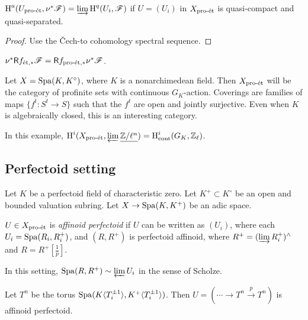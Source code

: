 \begin{lemma}
$\operatorname{H}^a(U_{\textnormal{pro-\'et}},\nu^\ast \mathscr{F}) = \varinjlim \operatorname{H}^q(U_i,\mathscr{F})$ if 
$U=(U_i)$ in $X_{\textnormal{pro-\'et}}$ is quasi-compact and quasi-separated. 
\end{lemma}
\begin{proof}
Use the \v Cech-to cohomology spectral sequence. 
\end{proof}

\begin{lemma}
$\nu^\ast \mathsf R f_{\textnormal{\'et},\ast} \mathscr{F} = \mathsf R f_{\textnormal{pro-\'et},\ast} \nu^\ast \mathscr{F}$. 
\end{lemma}

\begin{example}
Let $X=\operatorname{Spa}(K,K^\circ)$, where $K$ is a nonarchimedean field. Then 
$X_{\textnormal{pro-\'et}}$ will be the category of profinite sets with continuous $G_K$-action. 
Coverings are families of maps $\{f^t:S^t \to S\}$ such that the $f^t$ are open 
and jointly surjective. Even when $K$ is algebraically closed, this is an 
interesting category. 
\end{example}

In this example, $\operatorname{H}^i(X_{\textnormal{pro-\'et}},\varprojlim \underline{\mathbb{Z}/\ell^n}) = \operatorname{H}^i_\text{cont}(G_K,\mathbb{Z}_\ell)$. 






\subsection{Perfectoid setting}

Let $K$ be a perfectoid field of characteristic zero. Let 
$K^+\subset K^\circ$ be an open and bounded valuation subring. Let 
$X\to \operatorname{Spa}(K,K^+)$ be an adic space. 

\begin{definition}\label{def:aff-perf}
$U\in X_{\textnormal{pro-\'et}}$ is \emph{affinoid perfectoid} if $U$ can be written as 
$(U_i)$, where each $U_i=\operatorname{Spa}(R_i,R_i^+)$, and $(R,R^+)$ is perfectoid 
affinoid, where $R^+=(\varinjlim R_i^+)^\wedge$ and $R=R^+[\frac 1 p]$. 
\end{definition}

In this setting, $\operatorname{Spa}(R,R^+)\sim \varprojlim U_i$ in the sense of Scholze. 

\begin{example}
Let $T^n$ be the torus $\operatorname{Spa}(K\langle T_i^{\pm 1}\rangle,K^+\langle T_i^{\pm 1}\rangle)$. 
Then $U=(\cdots \to T^n \xrightarrow p T^n)$ is affinoid perfectoid. 
\end{example}

